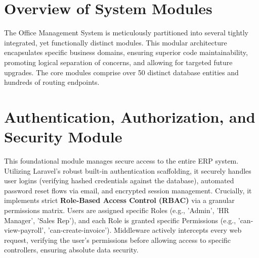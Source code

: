 ﻿\documentclass[12pt,a4paper]{report}
\begin{document}
\newpage
\section*{Overview of System Modules}
The Office Management System is meticulously partitioned into several tightly integrated, yet functionally distinct modules. This modular architecture encapsulates specific business domains, ensuring superior code maintainability, promoting logical separation of concerns, and allowing for targeted future upgrades. The core modules comprise over 50 distinct database entities and hundreds of routing endpoints.

\section*{Authentication, Authorization, and Security Module}
This foundational module manages secure access to the entire ERP system. Utilizing Laravel's robust built-in authentication scaffolding, it securely handles user logins (verifying hashed credentials against the database), automated password reset flows via email, and encrypted session management. 
Crucially, it implements strict \textbf{Role-Based Access Control (RBAC)} via a granular permissions matrix. Users are assigned specific Roles (e.g., 'Admin', 'HR Manager', 'Sales Rep'), and each Role is granted specific Permissions (e.g., 'can-view-payroll', 'can-create-invoice'). Middleware actively intercepts every web request, verifying the user's permissions before allowing access to specific controllers, ensuring absolute data security.
\end{document}
